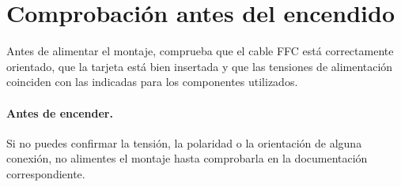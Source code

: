 \section{Comprobación antes del encendido}

Antes de alimentar el montaje, comprueba que el cable FFC está correctamente orientado,
que la tarjeta está bien insertada y que las tensiones de alimentación coinciden con las
indicadas para los componentes utilizados.

\paragraph{Antes de encender.}
Si no puedes confirmar la tensión, la polaridad o la orientación de alguna conexión,
no alimentes el montaje hasta comprobarla en la documentación correspondiente.

